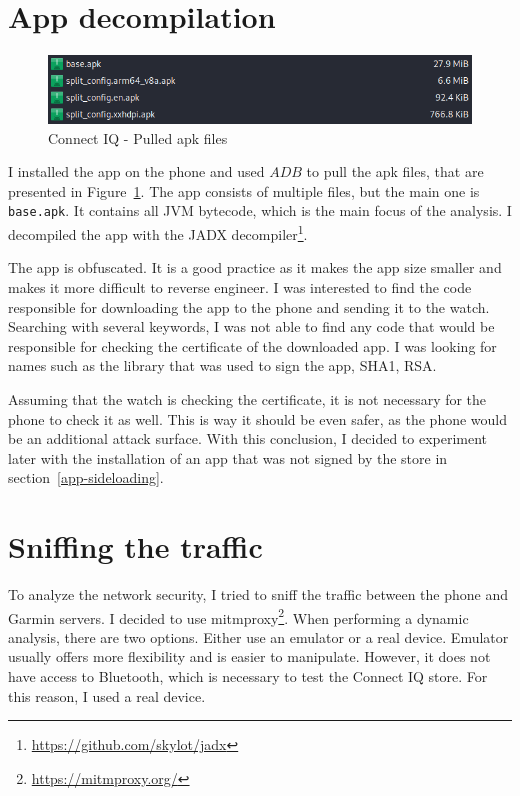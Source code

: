 \section{App decompilation}
\begin{figure}[h]
    \centering
    \includegraphics[width=0.7\linewidth]{../../images/connect-iq-apks}
    \caption{Connect IQ - Pulled apk files}
    \label{fig:connect-iq-apks}
\end{figure}
I installed the app on the phone and used $ADB$ to pull the apk files, that are presented in Figure~\ref{fig:connect-iq-apks}.
The app consists of multiple files, but the main one is \texttt{base.apk}.
It contains all JVM bytecode, which is the main focus of the analysis.
I decompiled the app with the JADX decompiler\footnote{\url{https://github.com/skylot/jadx}}.

The app is obfuscated.
It is a good practice as it makes the app size smaller and makes it more difficult to reverse engineer.
I was interested to find the code responsible for downloading the app to the phone and sending it to the watch.
Searching with several keywords, I was not able to find any code that would be responsible for checking the certificate of the downloaded app.
I was looking for names such as the library that was used to sign the app, SHA1, RSA\@.

Assuming that the watch is checking the certificate, it is not necessary for the phone to check it as well.
This is way it should be even safer, as the phone would be an additional attack surface.
With this conclusion, I decided to experiment later with the installation of an app that was not signed by the store in section~\ref{app-sideloading}.
%
%



\section{Sniffing the traffic}
To analyze the network security, I tried to sniff the traffic between the phone and Garmin servers.
I decided to use mitmproxy\footnote{\url{https://mitmproxy.org/}}.
When performing a dynamic analysis, there are two options.
Either use an emulator or a real device.
Emulator usually offers more flexibility and is easier to manipulate.
However, it does not have access to Bluetooth, which is necessary to test the Connect IQ store.
For this reason, I used a real device.


